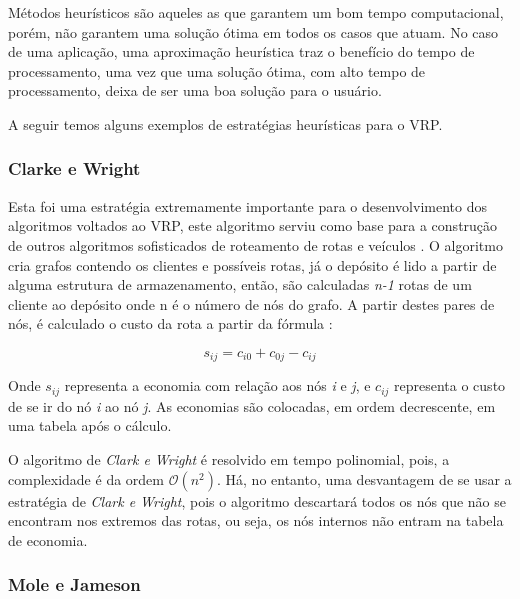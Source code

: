 Métodos heurísticos são aqueles as que garantem um bom tempo computacional, porém, não garantem uma solução ótima em todos os casos que atuam. No caso de uma aplicação, uma aproximação heurística traz o benefício do tempo de processamento, uma vez que uma solução ótima, com alto tempo de processamento, deixa de ser uma boa solução para o usuário. 

A seguir temos alguns exemplos de estratégias heurísticas para o VRP.

\subsubsection{Clarke e Wright}

Esta foi uma estratégia extremamente importante para o desenvolvimento dos algoritmos voltados ao VRP, este algoritmo serviu como base para a construção de outros algoritmos sofisticados de roteamento de rotas e veículos \cite{milton-nascimento}. O algoritmo cria grafos contendo os clientes e possíveis rotas, já o depósito é lido a partir de alguma estrutura de armazenamento, então, são calculadas \emph{n-1} rotas de um cliente ao depósito onde n é o número de nós do grafo. A partir destes pares de nós, é calculado  o custo da rota a partir da fórmula \cite[p. 32]{maxwell}: 

\[ s_{ij} = c_{i0} + c_{0j} - c_{ij} \]

Onde $s_{ij}$ representa a economia com relação aos nós \emph{i} e \emph{j}, e $c_{ij}$ representa o custo de se ir do nó \emph{i} ao nó \emph{j}. As economias são colocadas, em ordem decrescente, em uma tabela após o cálculo. 

O algoritmo de \emph{Clark e Wright} é resolvido em tempo polinomial, pois, a complexidade é da ordem $\mathcal{O}(n^2)$. Há, no entanto, uma desvantagem de se usar a estratégia de \emph{Clark e Wright}, pois o algoritmo descartará todos os nós que não se encontram nos extremos das rotas, ou seja, os nós internos não entram na tabela de economia.

\subsubsection{Mole e Jameson}

